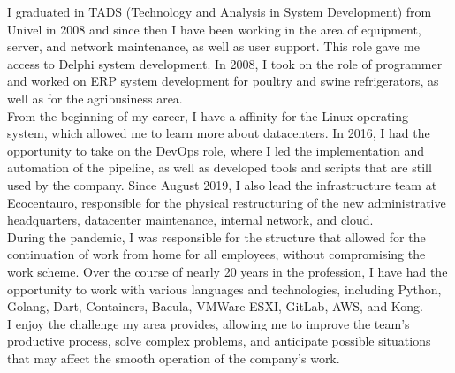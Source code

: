 \small
{
    I graduated in TADS (Technology and Analysis in System Development) from Univel in 2008 and since then I have been working in the area of equipment, 
    server, and network maintenance, as well as user support. This role gave me access to Delphi system development. 
    In 2008, I took on the role of programmer and worked on ERP system development for poultry and swine refrigerators, as well as for the agribusiness area.\\

    From the beginning of my career, I have a affinity for the Linux operating system, which allowed me to learn more about datacenters. 
    In 2016, I had the opportunity to take on the DevOps role, where I led the implementation and automation of the pipeline, 
    as well as developed tools and scripts that are still used by the company. Since August 2019, I also lead the infrastructure team at Ecocentauro, 
    responsible for the physical restructuring of the new administrative headquarters, datacenter maintenance, internal network, and cloud.\\

    During the pandemic, I was responsible for the structure that allowed for the continuation of work from home for all employees, 
    without compromising the work scheme. Over the course of nearly 20 years in the profession, I have had the opportunity to work with various languages and technologies, 
    including Python, Golang, Dart, Containers, Bacula, VMWare ESXI, GitLab, AWS, and Kong.\\

    I enjoy the challenge my area provides, allowing me to improve the team's productive process, solve complex problems, 
    and anticipate possible situations that may affect the smooth operation of the company's work.
}